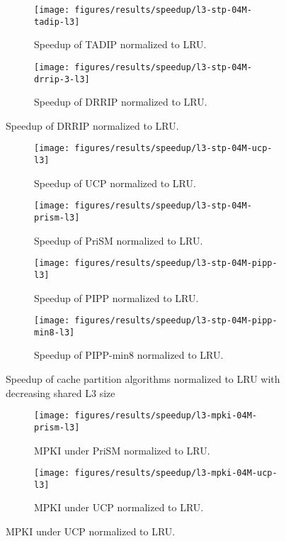 \begin{figure}[!htb]
    \centering
    \begin{subfigure}[b]{0.5\textwidth}
        \texttt{[image: figures/results/speedup/l3-stp-04M-tadip-l3]}
        \caption{Speedup of TADIP normalized to LRU.}
        \label{fig:results:l3:tadip}
    \end{subfigure}%
    \begin{subfigure}[b]{0.5\textwidth}
        \texttt{[image: figures/results/speedup/l3-stp-04M-drrip-3-l3]}
        \caption{Speedup of DRRIP normalized to LRU.}
        \label{fig:results:l3:drrip}
    \end{subfigure}
\end{figure}
\clearpage
\begin{figure}[!htb]
    \ContinuedFloat
    \begin{subfigure}[b]{0.5\textwidth}
        \texttt{[image: figures/results/speedup/l3-stp-04M-ucp-l3]}
        \caption{Speedup of UCP normalized to LRU.}
        \label{fig:results:l3:ucp}
    \end{subfigure}%
    \begin{subfigure}[b]{0.5\textwidth}
        \texttt{[image: figures/results/speedup/l3-stp-04M-prism-l3]}
        \caption{Speedup of PriSM normalized to LRU.}
        \label{fig:results:l3:prism}
    \end{subfigure}
    \begin{subfigure}[b]{0.5\textwidth}
        \texttt{[image: figures/results/speedup/l3-stp-04M-pipp-l3]}
        \caption{Speedup of PIPP normalized to LRU.}
        \label{fig:results:l3:pipp}
    \end{subfigure}%
    \begin{subfigure}[b]{0.5\textwidth}
        \texttt{[image: figures/results/speedup/l3-stp-04M-pipp-min8-l3]}
        \caption{Speedup of PIPP-min8 normalized to LRU.}
        \label{fig:results:l3:pipp-min8}
    \end{subfigure}
    \caption{Speedup of cache partition algorithms normalized to LRU with decreasing shared L3 size}
    \label{fig:results:l3}
\end{figure}

\begin{figure}[!htb]
    \centering
    \begin{subfigure}[b]{0.5\textwidth}
        \texttt{[image: figures/results/speedup/l3-mpki-04M-prism-l3]}
        \caption{MPKI under PriSM normalized to LRU.}
        \label{fig:results:l3:mpki-prism}
    \end{subfigure}%
    \begin{subfigure}[b]{0.5\textwidth}
        \texttt{[image: figures/results/speedup/l3-mpki-04M-ucp-l3]}
        \caption{MPKI under UCP normalized to LRU.}
        \label{fig:results:l3:mpki-ucp}
    \end{subfigure}
\end{figure}

